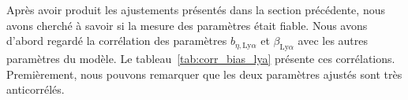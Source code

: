 \documentclass[11pt, twoside, a4paper, openright]{report}
\begin{document}
Après avoir produit les ajustements présentés dans la section précédente, nous avons cherché à savoir si la mesure des paramètres \lya{} était fiable. Nous avons d'abord regardé la corrélation des paramètres $b_{\eta,\mathrm{Ly}\alpha}$ et $\beta_{\mathrm{Ly}\alpha}$ avec les autres paramètres du modèle. Le tableau~\ref{tab:corr_bias_lya} présente ces corrélations.
Premièrement, nous pouvons remarquer que les deux paramètres \lya{} ajustés sont très anticorrélés.
\end{document}
